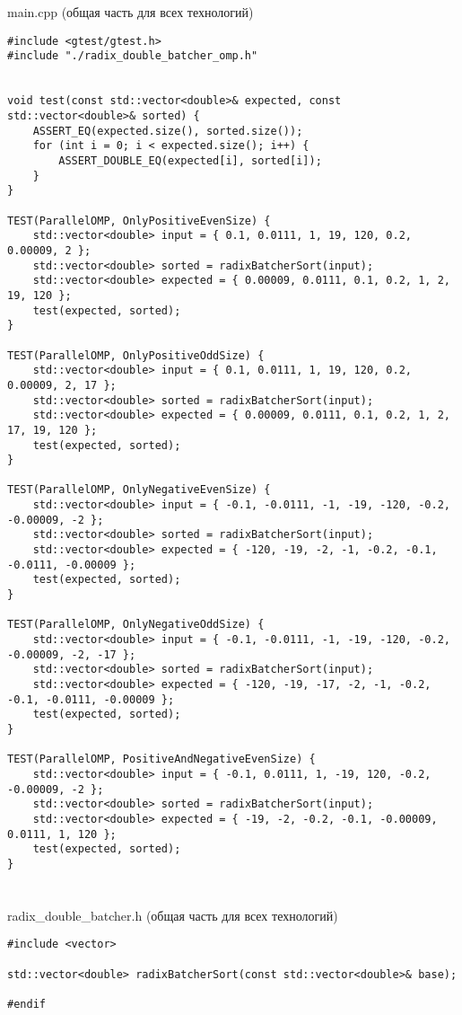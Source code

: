 \documentclass[12pt,a4paper]{article}
\begin{document}
\section{}main.cpp (общая часть для всех технологий)
\begin{lstlisting}
#include <gtest/gtest.h>
#include "./radix_double_batcher_omp.h"


void test(const std::vector<double>& expected, const std::vector<double>& sorted) {
    ASSERT_EQ(expected.size(), sorted.size());
    for (int i = 0; i < expected.size(); i++) {
        ASSERT_DOUBLE_EQ(expected[i], sorted[i]);
    }
}

TEST(ParallelOMP, OnlyPositiveEvenSize) {
    std::vector<double> input = { 0.1, 0.0111, 1, 19, 120, 0.2, 0.00009, 2 };
    std::vector<double> sorted = radixBatcherSort(input);
    std::vector<double> expected = { 0.00009, 0.0111, 0.1, 0.2, 1, 2, 19, 120 };
    test(expected, sorted);
}

TEST(ParallelOMP, OnlyPositiveOddSize) {
    std::vector<double> input = { 0.1, 0.0111, 1, 19, 120, 0.2, 0.00009, 2, 17 };
    std::vector<double> sorted = radixBatcherSort(input);
    std::vector<double> expected = { 0.00009, 0.0111, 0.1, 0.2, 1, 2, 17, 19, 120 };
    test(expected, sorted);
}

TEST(ParallelOMP, OnlyNegativeEvenSize) {
    std::vector<double> input = { -0.1, -0.0111, -1, -19, -120, -0.2, -0.00009, -2 };
    std::vector<double> sorted = radixBatcherSort(input);
    std::vector<double> expected = { -120, -19, -2, -1, -0.2, -0.1, -0.0111, -0.00009 };
    test(expected, sorted);
}

TEST(ParallelOMP, OnlyNegativeOddSize) {
    std::vector<double> input = { -0.1, -0.0111, -1, -19, -120, -0.2, -0.00009, -2, -17 };
    std::vector<double> sorted = radixBatcherSort(input);
    std::vector<double> expected = { -120, -19, -17, -2, -1, -0.2, -0.1, -0.0111, -0.00009 };
    test(expected, sorted);
}

TEST(ParallelOMP, PositiveAndNegativeEvenSize) {
    std::vector<double> input = { -0.1, 0.0111, 1, -19, 120, -0.2, -0.00009, -2 };
    std::vector<double> sorted = radixBatcherSort(input);
    std::vector<double> expected = { -19, -2, -0.2, -0.1, -0.00009, 0.0111, 1, 120 };
    test(expected, sorted);
}
\end{lstlisting}
\section{} radix\_double\_batcher.h (общая часть для всех технологий)
\begin{lstlisting}
#include <vector>

std::vector<double> radixBatcherSort(const std::vector<double>& base);

#endif
\end{lstlisting}
\end{document}
